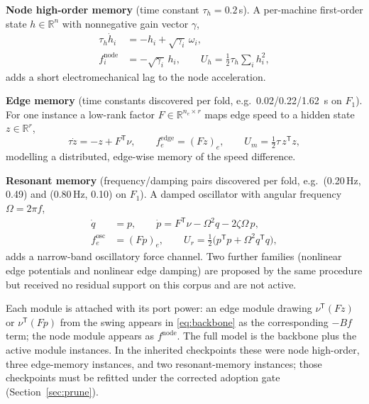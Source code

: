 \documentclass[journal]{IEEEtran}
\newcommand{\R}{\mathbb{R}}
\begin{document}
\textbf{Node high-order memory} (time constant $\tau_h{=}0.2$\,s). A per-machine
first-order state $h\in\R^n$ with nonnegative gain vector $\gamma$,
\begin{equation}
\begin{aligned}
\tau_h \dot h_i &= -h_i + \sqrt{\gamma_i}\,\omega_i,\\
f_i^{\text{node}} &= -\sqrt{\gamma_i}\,h_i,\qquad
U_h = \tfrac12\tau_h\sum_i h_i^2,
\end{aligned}
\label{eq:nodeho}
\end{equation}
adds a short electromechanical lag to the node acceleration.

\textbf{Edge memory} (time constants discovered per fold, e.g.\ 0.02/0.22/1.62~s
on $F_1$). For one instance a low-rank factor $F\in\R^{n_e\times r}$ maps edge
speed to a hidden state $z\in\R^r$,
\begin{equation}
\tau \dot z = -z + F^{\mathsf T}\nu,\qquad
f_e^{\text{edge}} = (Fz)_e,\qquad
U_m = \tfrac12\tau\, z^{\mathsf T}z,
\label{eq:edgemem}
\end{equation}
modelling a distributed, edge-wise memory of the speed difference.

\textbf{Resonant memory} (frequency/damping pairs discovered per fold, e.g.\
(0.20\,Hz, 0.49) and (0.80\,Hz, 0.10) on $F_1$). A damped oscillator with
angular frequency $\Omega=2\pi f$,
\begin{equation}
\begin{aligned}
\dot q &= p,\qquad
\dot p = F^{\mathsf T}\nu - \Omega^2 q - 2\zeta\Omega\, p,\\
f_e^{\text{osc}} &= (Fp)_e,\qquad
U_r=\tfrac12\bigl(p^{\mathsf T}p+\Omega^2 q^{\mathsf T}q\bigr),
\end{aligned}
\label{eq:resmem}
\end{equation}
adds a narrow-band oscillatory force channel. Two further families
(nonlinear edge potentials and nonlinear edge damping) are proposed by the same
procedure but received no residual support on this corpus and are not active.

Each module is attached with its port power: an edge module drawing
$\nu^{\mathsf T}(Fz)$ or $\nu^{\mathsf T}(Fp)$ from the swing appears in
\eqref{eq:backbone} as the corresponding $-B f$ term; the node module appears as
$f^{\text{node}}$. The full model is the backbone plus the active module
instances. In the inherited checkpoints these were node high-order, three
edge-memory instances, and two resonant-memory instances; those checkpoints
must be refitted under the corrected adoption gate (Section~\ref{sec:prune}).
\end{document}
